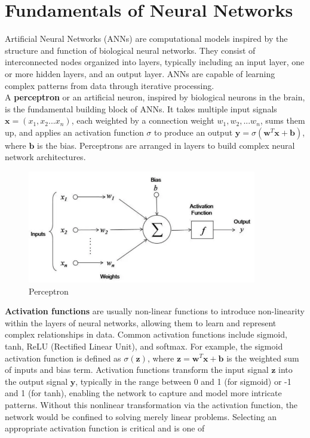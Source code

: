 \section{Fundamentals of Neural Networks}
Artificial Neural Networks (ANNs) are computational models inspired by the structure and function of biological neural networks. They consist of interconnected nodes organized into layers, typically including an input layer, one or more hidden layers, and an output layer. ANNs are capable of learning complex patterns from data through iterative processing. \\
A \textbf{perceptron} or an artificial neuron, inspired by biological neurons in the brain, is the fundamental building block of ANNs. It takes multiple input signals $\mathbf{x}= \left(x_1, x_2 ...x_n\right)$, each weighted by a connection weight $w_1,w_2,...w_n$, sums them up, and applies an activation function $\sigma$ to produce an output $\mathbf{y} = \sigma \left(\mathbf{w}^T\mathbf{x} + \mathbf{b} \right)$, where $\mathbf{b}$ is the bias. Perceptrons are arranged in layers to build complex neural network architectures.\\
\begin{figure}[ht]
    \centering
    \includegraphics[width=10cm]{images/Theory-DL/ActFn.png}
    \caption{Perceptron}
    \label{fig:Perceptron}
  \end{figure}
\textbf{Activation functions} are usually non-linear functions to introduce non-linearity within the layers of neural networks, allowing them to learn and represent complex relationships in data. Common activation functions include sigmoid, tanh, ReLU (Rectified Linear Unit), and softmax. For example, the sigmoid activation function is defined as $\sigma\left(\mathbf{z}\right)$, where $\mathbf{z} = \mathbf{w}^T\mathbf{x} + \mathbf{b}$ is the weighted sum of inputs and bias term. Activation functions transform the input signal $\mathbf{z}$ into the output signal $\mathbf{y}$, typically in the range between 0 and 1 (for sigmoid) or -1 and 1 (for tanh), enabling the network to capture and model more intricate patterns. Without this nonlinear transformation via the activation function, the network would be confined to solving merely linear problems. Selecting an appropriate activation function is critical and is one of
